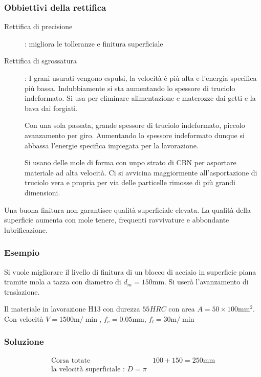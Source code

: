 \subsubsection{Obbiettivi della rettifica}
\begin{description}
\item[Rettifica di precisione]: migliora le tolleranze e finitura superficiale
\item[Rettifica di sgrossatura]: I grani usurati vengono espulsi, la velocità è più alta e l'energia specifica più bassa. Indubbiamente si sta aumentando lo spessore di truciolo indeformato.
Si usa per eliminare alimentazione e materozze dai getti e la bava dai forgiati.
\item[] Con una sola passata, grande spessore di truciolo indeformato, piccolo avanzamento per giro.
Aumentando lo spessore indeformato dunque si abbassa l'energie specifica impiegata per la lavorazione.
\item[] Si usano delle mole di forma con unpo strato di CBN per asportare materiale ad alta velocità. Ci si avvicina maggiormente all'asportazione di truciolo vera e propria per via delle particelle rimosse di più grandi dimensioni.
\end{description}

Una buona finitura non garantisce qualità superficiale elevata.
La qualità della superficie aumenta con mole tenere, frequenti ravvivature e abbondante lubrificazione.

\subsubsection*{Esempio}
Si vuole migliorare il livello di finitura di un blocco di acciaio in superficie piana tramite mola a tazza con diametro di $d_m = 150\unit{\mm}$. Si userà l'avanzamento di traslazione.

Il materiale in lavorazione H13 con durezza $55\unit{HRC}$
con area $A = 50 \times 100 \unit{\mm^2}$.
Con velocità $V = 1500\unit{\m/\min}$, $f_v = 0.05\unit{\mm}$, $f_l = 30\unit{\m/\min}$
\subsubsection*{Soluzione}
\begin{align*}
\text{Corsa totate} & 100 + 150 = 250\unit{\mm}\\
\text{la velocità superficiale : } D = \pi \\
\end{align*}

